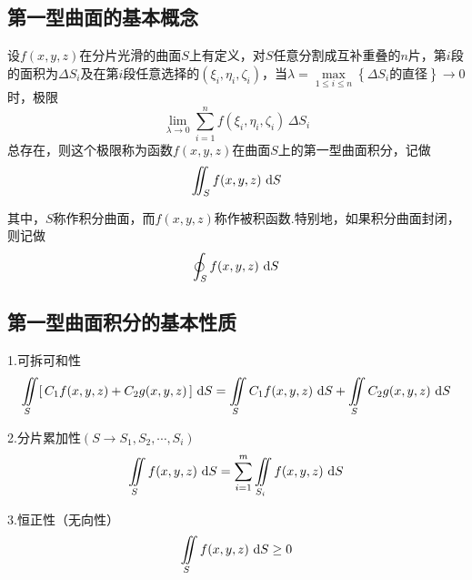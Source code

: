 \subsection{第一型曲面的基本概念}
\tdefination[第一型曲面积分的定义]
设$f(x,y,z)$在分片光滑的曲面$S$上有定义，对$S$任意分割成互补重叠的$n$片，第$i$段的面积为$\Delta S_i$及在第$i$段任意选择的$(\xi_i,\eta_i,\zeta_i)$，当$\lambda = \max\limits_{1 \le i \le n} \left\lbrace \Delta S_i\mbox{的直径}\right\rbrace \rightarrow 0$时，极限
\begin{equation}
\lim_{\lambda \rightarrow 0} \sum^{n}_{i=1} f(\xi_i,\eta_i,\zeta_i)\,\Delta S_i
\end{equation}
总存在，则这个极限称为函数$f(x,y,z)$在曲面$S$上的第一型曲面积分，记做
\begin{equation}
\iint_{S}f(x,y,z)\,\,{\rm{d}} S
\end{equation}
\par 其中，$S$称作积分曲面，而$f(x,y,z)$称作被积函数.特别地，如果积分曲面封闭，则记做
\begin{equation}
\oint_{S}f(x,y,z)\,\,{\rm{d}} S
\end{equation}

\subsection{第一型曲面积分的基本性质}
\ttheorem[第一型曲面积分的三个基本性质]
1.可拆可和性
\begin{equation}
\iint\limits_{S}[\,C_1f(x,y,z)+C_2g(x,y,z)\,]\,\,{\rm{d}} S =\iint\limits_{S}C_1f(x,y,z)\,\,{\rm{d}} S + \iint\limits_{S}C_2g(x,y,z)\,\,{\rm{d}} S
\end{equation}

\par 2.分片累加性$(S\rightarrow S_1,S_2,\cdots,S_i)$
\begin{equation}
\iint\limits_{S}f(x,y,z)\,\,{\rm{d}} S = \sum_{i=1}^{m}\iint\limits_{S_i}f(x,y,z)\,\,{\rm{d}} S
\end{equation}

\par 3.恒正性（无向性）
\begin{equation}
\iint\limits_{S}f(x,y,z)\,\,{\rm{d}} S \geq 0
\end{equation}

